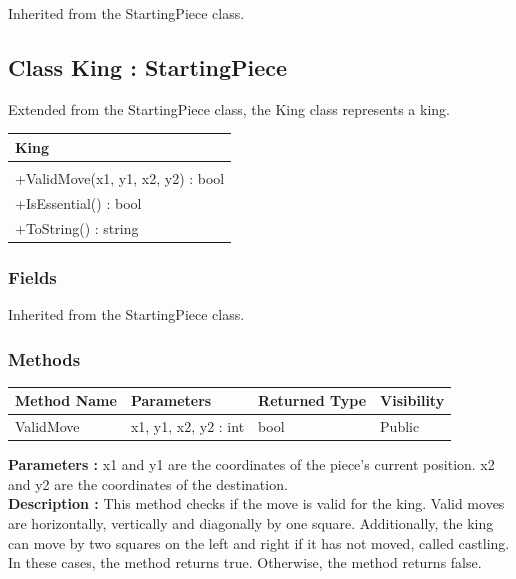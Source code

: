\documentclass[12pt]{article}
\begin{document}
    Inherited from the StartingPiece class.
    \newpage


    \subsection{Class King : StartingPiece}

    Extended from the StartingPiece class, the King class represents a king.
    \begin{table}[H]
        \begin{tabular}{|l|}
            \hline
            \cellcolor[HTML]{C0C0C0}\textbf{King} \\ \hline
            \cellcolor[HTML]{EFEFEF}              \\ \hline
            +ValidMove(x1, y1, x2, y2) : bool     \\ \hline
            +IsEssential() : bool                 \\ \hline
            +ToString() : string                  \\ \hline
        \end{tabular}
    \end{table}

    \subsubsection{Fields}

    Inherited from the StartingPiece class.

    \subsubsection{Methods}

    \begin{table}[H]
        \begin{tabular}{|l|l|l|l|}
            \hline
            \rowcolor[HTML]{EFEFEF}
            \cellcolor[HTML]{EFEFEF}\textbf{Method Name} & \textbf{Parameters}  & \textbf{Returned Type} & \textbf{Visibility} \\ \hline
            ValidMove                                    & x1, y1, x2, y2 : int & bool                   & Public              \\ \hline
        \end{tabular}
    \end{table}

    \textbf{Parameters :} x1 and y1 are the coordinates of the piece's current position.
    x2 and y2 are the coordinates of the destination.
    \\
    \textbf{Description :} This method checks if the move is valid for the king.
    Valid moves are horizontally, vertically and diagonally by one square.
    Additionally, the king can move by two squares on the left and right if it has not moved, called castling.
    In these cases, the method returns true.
    Otherwise, the method returns false.
\end{document}
